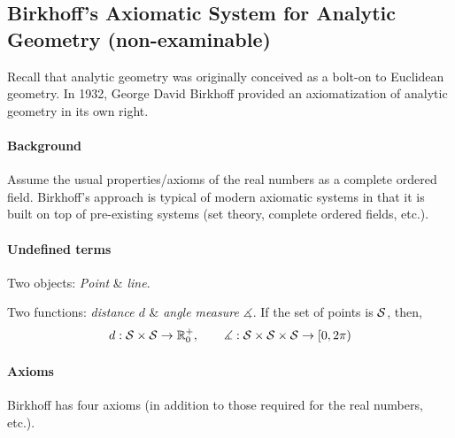 \begin{exercises}
\begin{enumerate}
	\end{enumerate}
\end{exercises}


\clearpage



\subsection{Birkhoff's Axiomatic System for Analytic Geometry (non-examinable)}

Recall that analytic geometry was originally conceived as a bolt-on to Euclidean geometry. In 1932, George David Birkhoff provided an axiomatization of analytic geometry in its own right. 

\paragraph{Background}

Assume the usual properties/axioms of the real numbers as a complete ordered field. Birkhoff's approach is typical of modern axiomatic systems in that it is built on top of pre-existing systems (set theory, complete ordered fields, etc.).

\paragraph{Undefined terms}

Two objects: \emph{Point} \& \emph{line}.\par
Two functions: \emph{distance $d$} \& \emph{angle measure $\measuredangle$}. If the set of points is $\mathcal{S}$, then,
\[
	d:\mathcal{S}\times\mathcal{S}\to\mathbb{R}^+_0,\qquad \measuredangle:\mathcal{S}\times\mathcal{S}\times\mathcal{S}\to [0,2\pi)
\]


\paragraph{Axioms}

Birkhoff has four axioms (in addition to those required for the real numbers, etc.).


